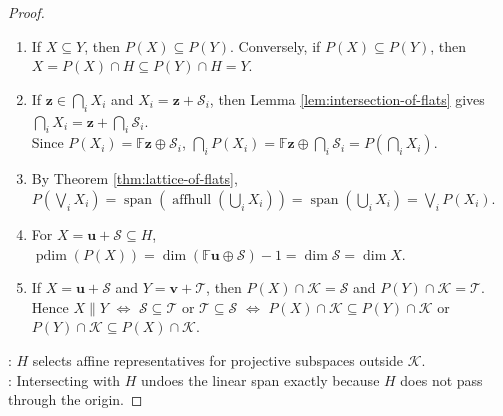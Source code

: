 \begin{theorem}
\begin{proof}
\begin{enumerate}[label=(\roman*)]
Then $\mathcal{U}\cap H=\mathbf{h}+(\mathcal{U}\cap\mathcal{K})$; $P(\mathcal{U}\cap H)=\mathbb{F}\mathbf{h}+(\mathcal{U}\cap\mathcal{K})=\mathcal{U}$. Thus $\operatorname{im}P=\{\mathcal{U}\leq\mathcal{V}:\mathcal{U}\nsubseteq\mathcal{K}\}$.
\item If $X\subseteq Y$, then $P(X)\subseteq P(Y)$. Conversely, if $P(X)\subseteq P(Y)$, then $X=P(X)\cap H\subseteq P(Y)\cap H=Y$.
\item If $\mathbf{z}\in\bigcap_i X_i$ and $X_i=\mathbf{z}+\mathcal{S}_i$, then Lemma \ref{lem:intersection-of-flats} gives $\bigcap_i X_i=\mathbf{z}+\bigcap_i\mathcal{S}_i$.\\
Since $P(X_i)=\mathbb{F}\mathbf{z}\oplus\mathcal{S}_i$, $\bigcap_i P(X_i)=\mathbb{F}\mathbf{z}\oplus\bigcap_i\mathcal{S}_i =P\left(\bigcap_iX_i\right)$.
\item By Theorem \ref{thm:lattice-of-flats}, $P\left(\bigvee_i X_i\right) =\operatorname{span}\left(\operatorname{affhull}\left(\bigcup_i X_i\right)\right) =\operatorname{span}\left(\bigcup_i X_i\right) =\bigvee_i P(X_i)$.
\item For $X=\mathbf{u}+\mathcal{S}\subseteq H$, $\operatorname{pdim}(P(X))=\dim(\mathbb{F}\mathbf{u}\oplus\mathcal{S})-1=\dim\mathcal{S}=\dim X$.
\item If $X=\mathbf{u}+\mathcal{S}$ and $Y=\mathbf{v}+\mathcal{T}$, then $P(X)\cap\mathcal{K}=\mathcal{S}$ and $P(Y)\cap\mathcal{K}=\mathcal{T}$.\\
Hence $X\parallel Y$ $\iff$ $\mathcal{S}\subseteq\mathcal{T}$ or $\mathcal{T}\subseteq\mathcal{S}$ $\iff$ $P(X)\cap\mathcal{K}\subseteq P(Y)\cap\mathcal{K}$ or $P(Y)\cap\mathcal{K}\subseteq P(X)\cap\mathcal{K}$.
\end{enumerate}
: $H$ selects affine representatives for projective subspaces outside $\mathcal{K}$.\\
: Intersecting with $H$ undoes the linear span exactly because $H$ does not pass through the origin.
\end{proof}
\end{theorem}
